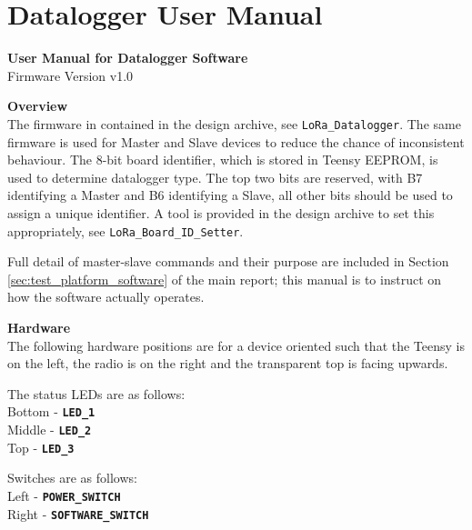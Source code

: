 \chapter{Datalogger User Manual}\label{sec:user_manual}
\textbf{User Manual for Datalogger Software} \\ 
Firmware Version v1.0

\textbf{Overview}\\
The firmware in contained in the design archive, see \texttt{LoRa\_Datalogger}. The same firmware is used for Master and Slave devices to reduce the chance of inconsistent behaviour. The 8-bit board identifier, which is stored in Teensy EEPROM, is used to determine datalogger type. The top two bits are reserved, with B7 identifying a Master and B6 identifying a Slave, all other bits should be used to assign a unique identifier. A tool is provided in the design archive to set this appropriately, see \texttt{LoRa\_Board\_ID\_Setter}.

Full detail of master-slave commands and their purpose are included in Section \ref{sec:test_platform_software} of the main report; this manual is to instruct on how the software actually operates.

\textbf{Hardware}\\
The following hardware positions are for a device oriented such that the Teensy is on the left, the radio is on the right and the transparent top is facing upwards.

The status LEDs are as follows: \\
\phantom{-}\hspace{1cm}Bottom - \textbf{\texttt{LED\_1}} \\
\phantom{-}\hspace{1cm}Middle - \textbf{\texttt{LED\_2}}\\
\phantom{-}\hspace{1cm}Top - \textbf{\texttt{LED\_3}}

Switches are as follows: \\
\phantom{-}\hspace{1cm}Left - \textbf{\texttt{POWER\_SWITCH}} \\
\phantom{-}\hspace{1cm}Right - \textbf{\texttt{SOFTWARE\_SWITCH}}

